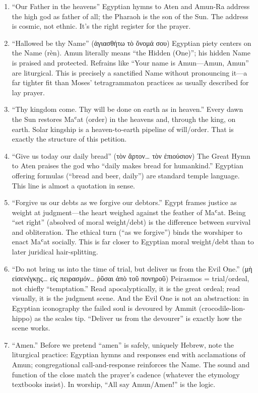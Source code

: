 \begin{enumerate}
\def\labelenumi{(\alph{enumi})}
\item
  ``Our Father in the heavens'' Egyptian hymns to Aten and Amun-Ra address the high god as father of all; the Pharaoh is the son of the Sun.
The address is cosmic, not ethnic.
It's the right register for the prayer.
\item
  ``Hallowed be thy Name'' (ἁγιασθήτω τὸ ὄνομά σου) Egyptian piety centers on the Name (rèn).
Amun literally means ``the Hidden (One)''; his hidden Name is praised and protected.
Refrains like ``Your name is Amun---Amun, Amun'' are liturgical.
This is precisely a sanctified Name without pronouncing it---a far tighter fit than Moses' tetragrammaton practices as usually described for lay prayer.
\item
  ``Thy kingdom come.
Thy will be done on earth as in heaven.'' Every dawn the Sun restores Maʿat (order) in the heavens and, through the king, on earth.
Solar kingship is a heaven-to-earth pipeline of will/order.
That is exactly the structure of this petition.
\item
  ``Give us today our daily bread'' (τὸν ἄρτον\ldots{} τὸν ἐπιούσιον) The Great Hymn to Aten praises the god who ``daily makes bread for humankind.'' Egyptian offering formulas (``bread and beer, daily'') are standard temple language.
This line is almost a quotation in sense.
\item
  ``Forgive us our debts as we forgive our debtors.'' Egypt frames justice as weight at judgment---the heart weighed against the feather of Maʿat.
Being ``set right'' (absolved of moral weight/debt) is the difference between survival and obliteration.
The ethical turn (``as we forgive'') binds the worshiper to enact Maʿat socially.
This is far closer to Egyptian moral weight/debt than to later juridical hair-splitting.
\item
  ``Do not bring us into the time of trial, but deliver us from the Evil One.'' (μὴ εἰσενέγκῃς\ldots{} εἰς πειρασμόν\ldots{} ῥῦσαι ἀπὸ τοῦ πονηροῦ) Peirasmos = trial/ordeal, not chiefly ``temptation.'' Read apocalyptically, it is the great ordeal; read visually, it is the judgment scene.
And the Evil One is not an abstraction: in Egyptian iconography the failed soul is devoured by Ammit (crocodile-lion-hippo) as the scales tip.
``Deliver us from the devourer'' is exactly how the scene works.
\item
  ``Amen.'' Before we pretend ``amen'' is safely, uniquely Hebrew, note the liturgical practice: Egyptian hymns and responses end with acclamations of Amun; congregational call-and-response reinforces the Name.
The sound and function of the close match the prayer's cadence (whatever the etymology textbooks insist).
In worship, ``All say Amun/Amen!'' is the logic.
\end{enumerate}

